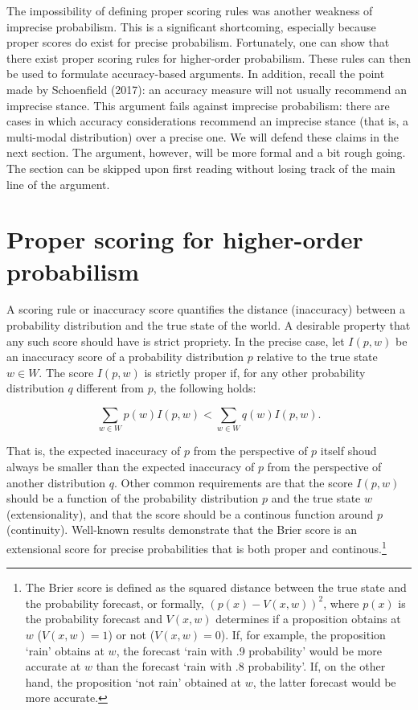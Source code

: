 \documentclass[
  letterpaper,
  DIV=11,
  numbers=noendperiod]{scrartcl}
\begin{document}
The impossibility of defining proper scoring rules was another weakness
of imprecise probabilism. This is a significant shortcoming, especially
because proper scores do exist for precise probabilism. Fortunately, one
can show that there exist proper scoring rules for higher-order
probabilism. These rules can then be used to formulate accuracy-based
arguments. In addition, recall the point made by Schoenfield (2017): an
accuracy measure will not usually recommend an imprecise stance. This
argument fails against imprecise probabilism: there are cases in which
accuracy considerations recommend an imprecise stance (that is, a
multi-modal distribution) over a precise one. We will defend these
claims in the next section. The argument, however, will be more formal
and a bit rough going. The section can be skipped upon first reading
without losing track of the main line of the argument.

\hypertarget{proper-scoring-for-higher-order-probabilism}{%
\section{Proper scoring for higher-order
probabilism}\label{proper-scoring-for-higher-order-probabilism}}

\label{sec:proper-scores}

A scoring rule or inaccuracy score quantifies the distance (inaccuracy)
between a probability distribution and the true state of the world. A
desirable property that any such score should have is strict propriety.
In the precise case, let \(I(p, w)\) be an inaccuracy score of a
probability distribution \(p\) relative to the true state \(w \in W\).
The score \(I(p, w)\) is strictly proper if, for any other probability
distribution \(q\) different from \(p\), the following holds:

\[\sum_{w\in W} p(w)I(p, w)< \sum_{w\in W} q(w)I(p, w).\]

\noindent  That is, the expected inaccuracy of \(p\) from the
perspective of \(p\) itself shoud always be smaller than the expected
inaccuracy of \(p\) from the perspective of another distribution \(q\).
Other common requirements are that the score \(I(p, w)\) should be a
function of the probability distribution \(p\) and the true state \(w\)
(extensionality), and that the score should be a continous function
around \(p\) (continuity). Well-known results demonstrate that the Brier
score is an extensional score for precise probabilities that is both
proper and
continous.\footnote{The Brier score is defined as the squared distance
  between the true state and the probability forecast, or formally,
  \((p(x)-V(x, w))^2\), where \(p(x)\) is the probability forecast and
  \(V(x, w)\) determines if a proposition obtains at \(w\)
  (\(V(x, w)=1\)) or not (\(V(x, w)=0\)). If, for example, the
  proposition `rain' obtains at \(w\), the forecast `rain with .9
  probability' would be more accurate at \(w\) than the forecast `rain
  with .8 probability'. If, on the other hand, the proposition `not
  rain' obtained at \(w\), the latter forecast would be more accurate.}
\end{document}
